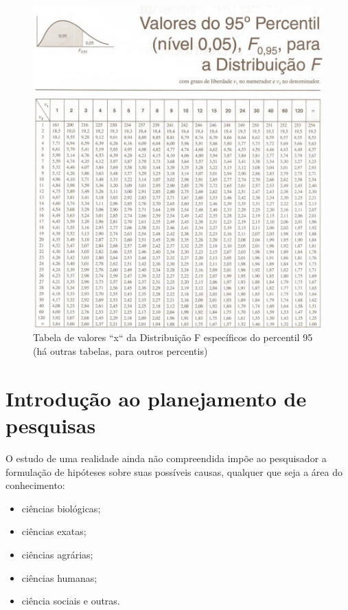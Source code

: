 \documentclass[
]{book}
\providecommand{\tightlist}{%
  \setlength{\itemsep}{0pt}\setlength{\parskip}{0pt}}
\begin{document}
\begin{figure}

{\centering \includegraphics[width=1\linewidth]{images6/distF} 

}

\caption{Tabela de valores ``x`` da Distribuição F específicos do percentil 95 (há outras tabelas, para outros percentis)}\label{fig:fig33}
\end{figure}

\hypertarget{planejamento_pesquisas}{%
\chapter{Introdução ao planejamento de pesquisas}\label{planejamento_pesquisas}}

O estudo de uma realidade ainda não compreendida impõe ao pesquisador a formulação de hipóteses sobre suas possíveis causas, qualquer que seja a área do conhecimento:

\hfill\break

\begin{itemize}
\tightlist
\item
  ciências biológicas;\\
\item
  ciências exatas;\\
\item
  ciências agrárias;\\
\item
  ciências humanas;\\
\item
  ciência sociais e outras.
\end{itemize}
\end{document}

